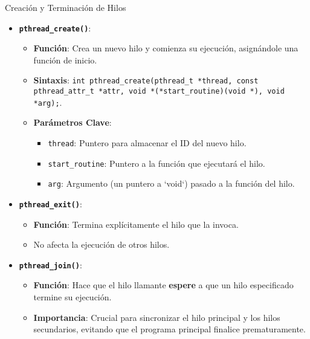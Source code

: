 \documentclass{beamer}
\begin{document}
\begin{frame}{Creación y Terminación de Hilos}
    \begin{itemize}
        \item \textbf{\texttt{pthread\_create()}}:
        \begin{itemize}
            \item \textbf{Función}: Crea un nuevo hilo y comienza su ejecución, asignándole una función de inicio.
            \item \textbf{Sintaxis}:
                \texttt{int pthread\_create(pthread\_t *thread, const pthread\_attr\_t *attr, void *(*start\_routine)(void *), void *arg);}.
            \item \textbf{Parámetros Clave}:
                \begin{itemize}
                    \item \texttt{thread}: Puntero para almacenar el ID del nuevo hilo.
                    \item \texttt{start\_routine}: Puntero a la función que ejecutará el hilo.
                    \item \texttt{arg}: Argumento (un puntero a `void`) pasado a la función del hilo.
                \end{itemize}
        \end{itemize}
        \item \textbf{\texttt{pthread\_exit()}}:
        \begin{itemize}
            \item \textbf{Función}: Termina explícitamente el hilo que la invoca.
            \item No afecta la ejecución de otros hilos.
        \end{itemize}
        \item \textbf{\texttt{pthread\_join()}}:
        \begin{itemize}
            \item \textbf{Función}: Hace que el hilo llamante \textbf{espere} a que un hilo especificado termine su ejecución.
            \item \textbf{Importancia}: Crucial para sincronizar el hilo principal y los hilos secundarios, evitando que el programa principal finalice prematuramente.
        \end{itemize}
    \end{itemize}
\end{frame}
\end{document}
